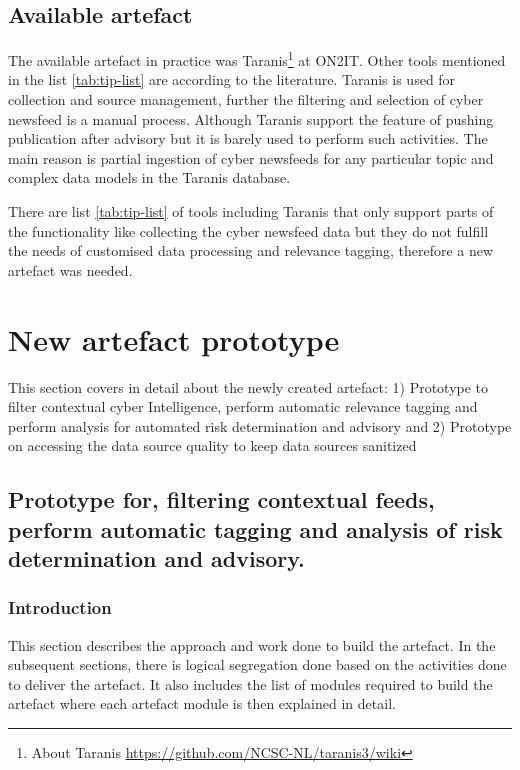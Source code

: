 \subsection{Available artefact}
The available artefact in practice was Taranis\footnote{About Taranis \url{https://github.com/NCSC-NL/taranis3/wiki}} at ON2IT. Other tools mentioned in the list \ref{tab:tip-list} are according to the literature. 
Taranis is used for collection and source management, 
further the filtering and selection of cyber newsfeed is a manual process. 
Although Taranis support the feature of pushing publication after advisory but it is barely used to perform such activities. 
The main reason is partial ingestion of cyber newsfeeds for any particular topic and complex data models in the Taranis database. 

There are list \ref{tab:tip-list} of tools  including Taranis  that only support parts of the functionality like collecting the cyber newsfeed data but they do not fulfill the  needs of customised data processing and relevance tagging,  therefore a new artefact was needed.

\section{New artefact prototype}\label{New artefact prototype design}
This section covers in detail about the newly created artefact:  
1) Prototype to filter contextual cyber Intelligence, perform automatic relevance tagging and perform analysis for automated risk determination and advisory and 
2)  Prototype on accessing the data source quality to keep data sources sanitized

\subsection{Prototype for, filtering contextual feeds, perform automatic tagging and analysis of risk determination and advisory.}

\subsubsection{Introduction}
This section describes the approach and work done to build the artefact. 
In the subsequent sections, there is logical segregation done based on the activities done to deliver the artefact.
It also includes the list of modules required to build the artefact where 
each artefact module is then explained in detail. 

